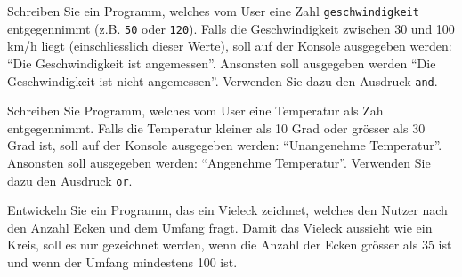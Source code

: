 \begin{myexercise}\label{ex:geschwindigkeitAngemessen}
	Schreiben Sie ein Programm, welches vom User eine Zahl \lstinline|geschwindigkeit| entgegennimmt (z.B. \lstinline|50| oder \lstinline|120|). Falls die Geschwindigkeit zwischen 30 und 100 km/h liegt (einschliesslich dieser Werte), soll auf der Konsole ausgegeben werden: \enquote{Die Geschwindigkeit ist angemessen}. Ansonsten soll ausgegeben werden \enquote{Die Geschwindigkeit ist nicht angemessen}. Verwenden Sie dazu den Ausdruck \lstinline|and|.
	\begin{myanswer}
		
	\end{myanswer}
\end{myexercise}

\begin{myexercise}\label{ex:tempUnangenehm}
	Schreiben Sie Programm, welches vom User eine Temperatur als Zahl entgegennimmt. Falls die Temperatur kleiner als 10 Grad oder grösser als 30 Grad ist, soll auf der Konsole ausgegeben werden: \enquote{Unangenehme Temperatur}. Ansonsten soll ausgegeben werden: \enquote{Angenehme Temperatur}. Verwenden Sie dazu den Ausdruck \lstinline|or|.

	\begin{myanswer}
		
	\end{myanswer}
\end{myexercise}

\begin{myexercise}
	Entwickeln Sie ein Programm, das ein Vieleck zeichnet, welches den Nutzer nach den Anzahl Ecken und dem Umfang fragt. Damit das Vieleck aussieht wie ein Kreis, soll es nur gezeichnet werden, wenn die Anzahl der Ecken grösser als 35 ist und wenn der Umfang mindestens 100 ist.
	\begin{myanswer}
		
	\end{myanswer}
\end{myexercise}

